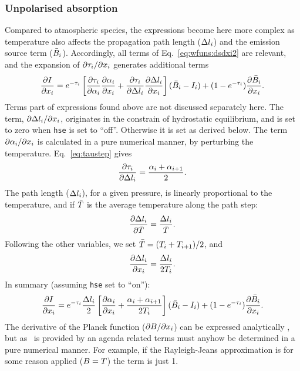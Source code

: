 \subsubsection{Unpolarised absorption}
%
Compared to atmospheric species, the expressions become here more complex as
temperature also affects the propagation path length ($\Delta l_{i}$)
and the emission source term ($\bar{B}_i$). Accordingly, all terms of
Eq.~\ref{eq:wfuns:dsdxi2} are relevant, and the expansion of
$\partial\tau_{i}/\partial x_{i}$ generates additional terms
\begin{equation}
  \frac{\partial I}{\partial x_{i}} =
   e^{-\tau_{i}}\left[
      \frac{\partial\tau_{i}}{\partial{\alpha}_{i}}
      \frac{\partial{\alpha}_{i}}{\partial x_{i}} + 
      \frac{\partial\tau_{i}}{\partial\Delta l_{i}}
     \frac{\partial\Delta l_{i}}{\partial x_{i}}
  \right](\bar{B}_i-I_{i})+
  (1-e^{-\tau_{i}})\frac{\partial\bar{B}_i}{\partial x_{i}}.  
\end{equation}
Terms part of expressions found above are not discussed separately here. The
term, $\partial\Delta l_{i}/\partial x_{i}$, originates in the
constrain of hydrostatic equilibrium, and is set to zero when \verb|hse| 
is set to ``off''. Otherwise it is set as derived below.
The term $\partial{\alpha}_{i}/\partial x_{i}$ is calculated in a pure
numerical manner, by perturbing the temperature. Eq.~\ref{eq:taustep} gives
\begin{equation}
  \frac{\partial \tau_{i}}{\partial \Delta l_{i}} = 
  \frac{{\alpha}_{i}+{\alpha}_{i+1}}{2}. 
\end{equation}
The path length ($\Delta l_{i}$), for a given pressure, is linearly
proportional to the temperature, and if $\bar{T}$ is the average temperature
along the path step:
\begin{equation}
  \frac{\partial \Delta l_{i}}{\partial \bar{T}} =   
                                    \frac{\Delta l_{i}}{\bar{T}}.
\end{equation}
Following the other variables, we set $\bar{T}=(T_{i}+T_{i+1})/2$, and
\begin{equation}
  \frac{\partial \Delta l_{i}}{\partial x_{i}} = 
                                    \frac{\Delta l_{i}}{2T_{i}}.
\end{equation}
In summary (assuming \verb|hse| set to ``on''):
\begin{equation}
  \frac{\partial I}{\partial x_{i}} =
   e^{-\tau_{i}}\frac{\Delta l_{i}}{2}\left[
      \frac{\partial{\alpha}_{i}}{\partial x_{i}} + 
  \frac{{\alpha}_{i}+{\alpha}_{i+1}}{2T_{i}}
  \right](\bar{B}_i-I_{i})+
  (1-e^{-\tau_{i}})\frac{\partial\bar{B}_i}{\partial x_{i}}.  
\end{equation}
The derivative of the Planck function ($\partial B/\partial x_{i}$) can
be expressed analytically \citep{eriksson:studi:02}, but as \Planck\ is
provided by an agenda related terms must anyhow be determined in a pure
numerical manner. For example, if the Rayleigh-Jeans approximation is for some
reason applied ($B=T$) the term is just 1.

